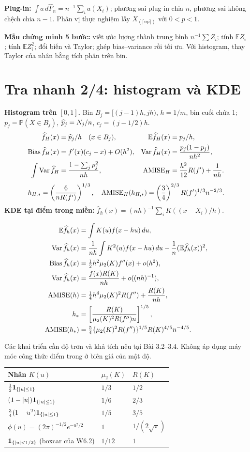 \documentclass[11pt,a4paper]{article}
\newcommand{\E}{\mathbb E}\newcommand{\Pp}{\mathbb P}
\DeclareMathOperator{\Var}{Var}\DeclareMathOperator{\Cov}{Cov}
\DeclareMathOperator{\Bias}{Bias}\DeclareMathOperator{\MSE}{MSE}
\newcommand{\Fh}{\widehat F_n}\newcommand{\fh}{\widehat f_h}
\begin{document}
\textbf{Plug-in:} $\int a\,d\Fh=n^{-1}\sum_i a(X_i)$; phương sai plug-in chia $n$, phương sai không chệch chia $n-1$. Phân vị thực nghiệm lấy $X_{(\lceil np\rceil)}$ với $0<p<1$.

\textbf{Mẫu chứng minh 5 bước:} viết ước lượng thành trung bình $n^{-1}\sum Z_i$; tính $\E Z_i$; tính $\E Z_i^2$; đổi biến và Taylor; ghép bias--variance rồi tối ưu. Với histogram, thay Taylor của nhân bằng tích phân trên bin.
\clearpage
\section*{Tra nhanh 2/4: histogram và KDE}
\textbf{Histogram trên $[0,1]$.} Bin $B_j=[(j-1)h,jh)$, $h=1/m$, bin cuối chứa 1;
$p_j=\Pp(X\in B_j)$, $\widehat p_j=N_j/n$, $c_j=(j-1/2)h$.
\begin{align*}
\widehat f_H(x)&=\ph_j/h\quad(x\in B_j),&\E\widehat f_H(x)&=p_j/h,\\
\Bias\widehat f_H(x)&=f'(x)(c_j-x)+O(h^2),&\Var\widehat f_H(x)&=\frac{p_j(1-p_j)}{nh^2},\\
\int\Var\widehat f_H&=\frac{1-\sum_jp_j^2}{nh},&\AMISE_H&=\frac{h^2}{12}R(f')+\frac1{nh}.
\end{align*}
\[
h_{H,*}=\left(\frac6{nR(f')}\right)^{1/3},\quad
\operatorname{AMISE}_H(h_{H,*})=\left(\frac34\right)^{2/3}R(f')^{1/3}n^{-2/3}.
\]
\textbf{KDE tại điểm trong miền:} $\fh(x)=(nh)^{-1}\sum_iK((x-X_i)/h)$.
\begin{result}
\begin{align*}
\E\fh(x)&=\int K(u)f(x-hu)\,du,\\
\Var\fh(x)&=\frac1{nh}\int K^2(u)f(x-hu)\,du-\frac1n(\E\fh(x))^2,\\
\Bias\fh(x)&=\tfrac12h^2\mu_2(K)f''(x)+o(h^2),\\
\Var\fh(x)&=\frac{f(x)R(K)}{nh}+o((nh)^{-1}),\\
\AMISE(h)&=\tfrac14h^4\mu_2(K)^2R(f'')+\frac{R(K)}{nh},\\
h_*&=\left[\frac{R(K)}{\mu_2(K)^2R(f'')n}\right]^{1/5},\\
\AMISE(h_*)&=\tfrac54\{\mu_2(K)^2R(f'')\}^{1/5}R(K)^{4/5}n^{-4/5}.
\end{align*}
\end{result}
Các khai triển cần độ trơn và khả tích nêu tại Bài 3.2--3.4. Không áp dụng máy móc công thức điểm trong ở biên giá của mật độ.
\begin{center}\begin{tabular}{lll}
\toprule Nhân $K(u)$ & $\mu_2(K)$ & $R(K)$\\\midrule
$\frac12\mathbf 1_{\{|u|\le1\}}$ & $1/3$ & $1/2$\\
$(1-|u|)\mathbf 1_{\{|u|\le1\}}$ & $1/6$ & $2/3$\\
$\frac34(1-u^2)\mathbf 1_{\{|u|\le1\}}$ & $1/5$ & $3/5$\\
$\phi(u)=(2\pi)^{-1/2}e^{-u^2/2}$ & $1$ & $1/(2\sqrt\pi)$\\
$\mathbf 1_{\{|u|<1/2\}}$ (boxcar của W6.2) & $1/12$ & $1$\\\bottomrule
\end{tabular}\end{center}
\end{document}

